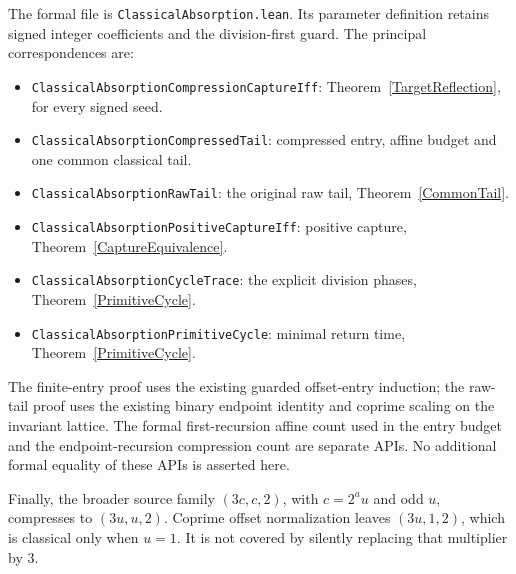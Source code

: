 \documentclass[11pt,letterpaper]{article}
\begin{document}
The formal file is \texttt{ClassicalAbsorption.lean}.
Its parameter definition retains signed integer coefficients and the
division-first guard. The principal correspondences are:
\begin{itemize}
\item \texttt{ClassicalAbsorptionCompressionCaptureIff}:
      Theorem~\ref{TargetReflection}, for every signed seed.
\item \texttt{ClassicalAbsorptionCompressedTail}:
      compressed entry, affine budget and one common classical tail.
\item \texttt{ClassicalAbsorptionRawTail}:
      the original raw tail, Theorem~\ref{CommonTail}.
\item \texttt{ClassicalAbsorptionPositiveCaptureIff}:
      positive capture, Theorem~\ref{CaptureEquivalence}.
\item \texttt{ClassicalAbsorptionCycleTrace}:
      the explicit division phases, Theorem~\ref{PrimitiveCycle}.
\item \texttt{ClassicalAbsorptionPrimitiveCycle}:
      minimal return time, Theorem~\ref{PrimitiveCycle}.
\end{itemize}
The finite-entry proof uses the existing guarded offset-entry induction;
the raw-tail proof uses the existing binary endpoint identity and
coprime scaling on the invariant lattice.
The formal first-recursion affine count used in the entry budget and
the endpoint-recursion compression count are separate APIs.
No additional formal equality of these APIs is asserted here.

Finally, the broader source family \((3c,c,2)\), with \(c=2^a u\) and odd
\(u\), compresses to \((3u,u,2)\). Coprime offset normalization leaves
\((3u,1,2)\), which is classical only when \(u=1\).
It is not covered by silently replacing that multiplier by \(3\).



\end{document}
